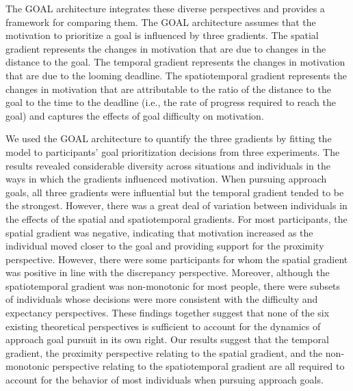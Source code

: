 \documentclass[a4paper,doc,natbib,donotrepeattitle]{apa6}
\begin{document}
The GOAL architecture integrates these diverse perspectives and provides a framework for comparing them. The GOAL architecture assumes that the motivation to prioritize a goal is influenced by three gradients. The spatial gradient represents the changes in motivation that are due to changes in the distance to the goal. The temporal gradient represents the changes in motivation that are due to the looming deadline. The spatiotemporal gradient represents the changes in motivation that are attributable to the ratio of the distance to the goal to the time to the deadline (i.e., the rate of progress required to reach the goal) and captures the effects of goal difficulty on motivation.

We used the GOAL architecture to quantify the three gradients by fitting the model to participants' goal prioritization decisions from three experiments. The results revealed considerable diversity across situations and individuals in the ways in which the gradients influenced motivation. When pursuing approach goals, all three gradients were influential but the temporal gradient tended to be the strongest. However, there was a great deal of variation between individuals in the effects of the spatial and spatiotemporal gradients. For most participants, the spatial gradient was negative, indicating that motivation increased as the individual moved closer to the goal and providing support for the proximity perspective. However, there were some participants for whom the spatial gradient was positive in line with the discrepancy perspective. Moreover, although the spatiotemporal gradient was non-monotonic for most people, there were subsets of individuals whose decisions were more consistent with the difficulty and expectancy perspectives. These findings together suggest that none of the six existing theoretical perspectives is sufficient to account for the dynamics of approach goal pursuit in its own right. Our results suggest that the temporal gradient, the proximity perspective relating to the spatial gradient, and the non-monotonic perspective relating to the spatiotemporal gradient are all required to account for the behavior of most individuals when pursuing approach goals.
\end{document}
